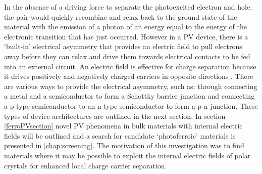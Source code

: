 \documentclass[11pt, twoside]{report}
\begin{document}
In the absence of a driving force to separate the photoexcited electron and hole, the pair would quickly recombine and relax back to the ground state of the material with the emission of a photon of an energy equal to the energy of the electronic transition that has just occurred. However in a PV device, there is a `built-in' electrical asymmetry that provides an electric field to pull electrons away before they can relax and drive them towards electrical contacts to be fed into an external circuit. An electric field is effective for charge separation because it drives positively and negatively charged carriers in opposite directions \cite{Nelson5}. There are various ways to provide the electrical asymmetry, such as: through connecting a metal and a semiconductor to form a Schottky barrier junction and connecting a p-type semiconductor to an n-type semiconductor to form a p-n junction. These types of device architectures are outlined in the next section. In section \ref{ferroPVsection} novel PV phenomena in bulk materials with internal electric fields will be outlined and a search for candidate `photoferroic' materials is presented in \autoref{chap:screening}. The motivation of this investigation was to find materials where it may be possible to exploit the internal electric fields of polar crystals for enhanced local charge carrier separation.
\end{document}
